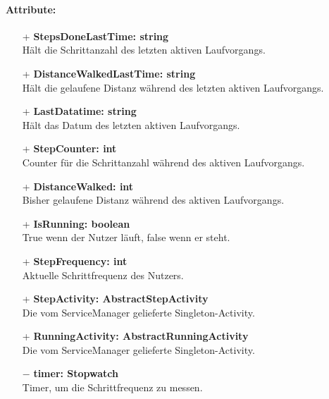 \documentclass[a4paper,12pt]{article}
\begin{document}
\paragraph{Attribute:}
\begin{itemize}
	\item[+] \textbf{StepsDoneLastTime: string} \\ Hält die Schrittanzahl des letzten aktiven Laufvorgangs. 
	\item[+] \textbf{DistanceWalkedLastTime: string} \\ Hält die gelaufene Distanz während des letzten aktiven Laufvorgangs. 
	\item[+] \textbf{LastDatatime: string} \\ Hält das Datum des letzten aktiven Laufvorgangs. 
	\item[+] \textbf{StepCounter: int} \\ Counter für die Schrittanzahl während des aktiven Laufvorgangs. 
	\item[+] \textbf{DistanceWalked: int} \\  Bisher gelaufene Distanz während des aktiven Laufvorgangs.
	\item[+] \textbf{IsRunning: boolean} \\ True wenn der Nutzer läuft, false wenn er steht. 
	\item[+] \textbf{StepFrequency: int} \\ Aktuelle Schrittfrequenz des Nutzers.
	\item[+] \textbf{StepActivity: AbstractStepActivity} \\ Die vom ServiceManager gelieferte Singleton-Activity.
	\item[+] \textbf{RunningActivity: AbstractRunningActivity} \\ Die vom ServiceManager gelieferte Singleton-Activity.
	\item[$-$] \textbf{timer: Stopwatch} \\ Timer, um die Schrittfrequenz zu messen.

\end{itemize}
\end{document}
